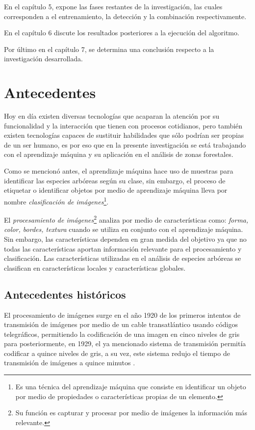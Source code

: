 En el capítulo 5, expone las fases restantes de la investigación, las cuales corresponden a el entrenamiento, la detección y la combinación respectivamente.

En el capítulo 6 discute los resultados posteriores a la ejecución del algoritmo.

Por último en el capítulo 7, se determina una conclusión respecto a la investigación desarrollada.

\chapter{Antecedentes}
Hoy en día existen diversas tecnologías que acaparan la atención por su funcionalidad y la interacción que tienen con procesos cotidianos, pero también existen tecnologías capaces de sustituir habilidades que sólo podrían ser propias de un ser humano, es por eso que en la presente investigación se está trabajando con el aprendizaje máquina y su aplicación en el análisis de zonas forestales.

Como se mencionó antes, el aprendizaje máquina hace uso de muestras para identificar las especies arbóreas según su clase, sin embargo, el proceso de etiquetar o identificar objetos por medio de aprendizaje máquina lleva por nombre \emph{clasificación de imágenes}\footnote{Es una técnica del aprendizaje máquina que consiste en identificar un objeto por medio de propiedades o características propias de un elemento.}.

El \emph{procesamiento de imágenes}\footnote{Su función es capturar y procesar por medio de imágenes la información más relevante.} analiza por medio de características como: \emph{forma, color, bordes, textura} cuando se utiliza en conjunto con el aprendizaje máquina. Sin embargo, las características dependen en gran medida del objetivo ya que no todas las características aportan información relevante para el procesamiento y clasificación. Las características utilizadas en el análisis de especies arbóreas se clasifican en características locales y características globales.

\section{Antecedentes históricos}
El procesamiento de imágenes surge en el año 1920 de los primeros intentos de transmisión de imágenes por medio de un cable transatlántico usando códigos telegráficos, permitiendo la codificación de una imagen en cinco niveles de gris para posteriormente, en 1929, el ya mencionado sistema de transmisión permitía codificar a quince niveles de gris, a su vez, este sistema redujo el tiempo de transmisión de imágenes a quince minutos \citep{rf4}. 

